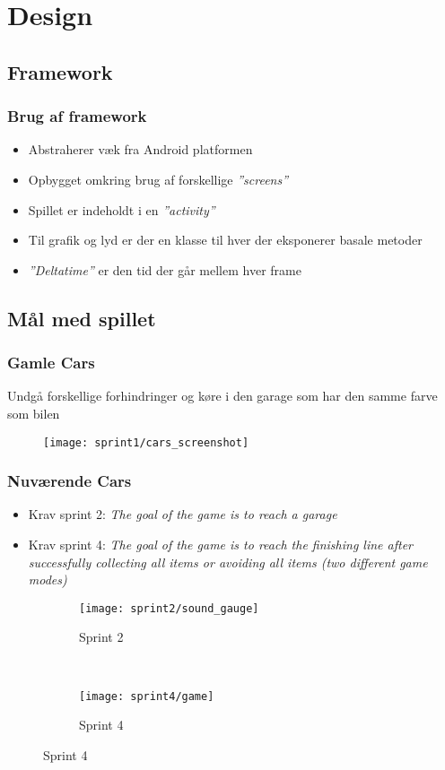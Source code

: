 \section{Design}


\subsection{Framework}
\begin{frame}
\frametitle{Brug af framework}
\begin{itemize}
\item Abstraherer væk fra Android platformen
\item Opbygget omkring brug af forskellige \textit{''screens''}
\item Spillet er indeholdt i en \textit{''activity''}
\item Til grafik og lyd er der en klasse til hver der eksponerer basale metoder
\item \textit{''Deltatime''} er den tid der går mellem hver frame
\end{itemize}
\end{frame}


\subsection{Mål med spillet}
\begin{frame}
\frametitle{Gamle Cars}
Undgå forskellige forhindringer og køre i den garage som har den samme farve som bilen
\begin{figure}
\texttt{[image: sprint1/cars\_screenshot]}
\end{figure}
\end{frame}

\begin{frame}
\frametitle{Nuværende Cars}
\begin{itemize}
\item Krav sprint 2: \textit{The goal of the game is to reach a garage}
\item Krav sprint 4: \textit{The goal of the game is to reach the finishing line
after successfully collecting all items or avoiding
all items (two different game modes)}
\end{itemize}
\begin{figure}
\begin{subfigure}[b]{0.4\textwidth}
\texttt{[image: sprint2/sound\_gauge]}
\caption{Sprint 2}
\end{subfigure}
~
\begin{subfigure}[b]{0.4\textwidth}
\texttt{[image: sprint4/game]}
\caption{Sprint 4}
\end{subfigure}
\end{figure}
\end{frame}


